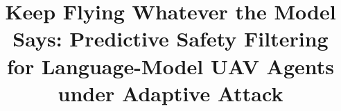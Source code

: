\newcommand{\R}{\mathbb{R}}
\newcommand{\uDes}{u^{\mathrm{des}}}
\newcommand{\btot}{b_{\mathrm{tot}}}
\newcommand{\badv}{b_{\mathrm{adv}}}
\newcommand{\dadv}{\delta_{\mathrm{adv}}}
\newcommand{\dnet}{\delta_{\mathrm{net}}}
\newcommand{\Lrho}{L_{\rho}}
\newcommand{\rhobar}{\bar\rho}
\newcommand{\rhofl}{\rho_{\mathrm{fl}}}
\newcommand{\wbar}{\bar w}
\newcommand{\Np}{N_{\mathrm{p}}}
\newcommand{\Ts}{T_{\mathrm{s}}}
\newcommand{\Tc}{T_{\mathrm{c}}}
\newcommand{\ksched}{\kappa_{\mathrm{sched}}}
\newcommand{\Cset}{\mathcal{C}}
\newcommand{\Aadm}{\mathcal{A}_{\mathrm{adm}}}
\newcommand{\PRA}{\mathsf{P}_{\mathrm{RA}}}
\newcommand{\PC}{\mathsf{P}_{\mathrm{C}}}
\newcommand{\unom}{u_{\mathrm{nom}}}
\newcommand{\umax}{u_{\max}}
\newcommand{\vmax}{v_{\max}}
\newcommand{\dsep}{d_{\mathrm{sep}}}
\newcommand{\bch}{b_{\mathrm{ch}}}
\newcommand{\pinom}{\pi_{\mathrm{nom}}}
\newcommand{\aLLM}{a^{\mathrm{LLM}}}
\newcommand{\MDR}{\mathrm{MDR}}
\newcommand{\MCR}{\mathrm{MCR}}
\newcommand{\SVR}{\mathrm{SVR}}
\newcommand{\IR}{\mathrm{IR}}
\newcommand{\BIR}{\mathrm{BIR}}
\newcommand{\FR}{\mathrm{FR}}
\newcommand{\CR}{\mathrm{CR}}
\newcommand{\Lhat}{\hat L_{\mathrm{loc}}}
\newcommand{\code}[1]{\texttt{\small #1}}
\DeclareMathOperator*{\argmin}{arg\,min}

\theoremstyle{plain}
\newtheorem{theorem}{Theorem}
\newtheorem{proposition}[theorem]{Proposition}
\newtheorem{corollary}[theorem]{Corollary}
\newtheorem{lemma}{Lemma}
\theoremstyle{definition}
\newtheorem{definition}{Definition}
\newtheorem{assumption}{Assumption}
\renewcommand{\theassumption}{A\arabic{assumption}}
\theoremstyle{remark}
\newtheorem{remark}{Remark}




\title{Keep Flying Whatever the Model Says: Predictive Safety Filtering for Language-Model UAV Agents under Adaptive Attack}

